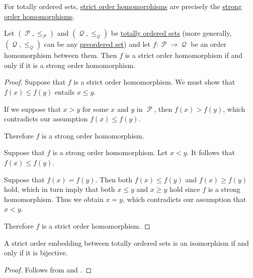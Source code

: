 \begin{proposition}\label{thm:totally_ordered_strong_homomorphism}
  For totally ordered sets, \hyperref[thm:partially_ordered_set/homomorphism]{strict order homomorphisms} are precisely the \hyperref[rem:first_order_strong_homomorphism]{strong order homomorphisms}.

  Let \( (\mscrP, \leq_\mscrP) \) and \( (\mscrQ, \leq_\mscrQ) \) be \hyperref[def:totally_ordered_set]{totally ordered sets} (more generally, \( (\mscrQ, \leq_\mscrQ) \) can be any \hyperref[def:preordered_set]{preordered set}) and let \( f: \mscrP \to \mscrQ \) be an order homomorphism between them. Then \( f \) is a strict order homomorphism if and only if it is a strong order homomorphism.
\end{proposition}
\begin{proof}
  \SufficiencySubProof Suppose that \( f \) is a strict order homomorphism. We must show that \( f(x) \leq f(y) \) entails \( x \leq y \).

  If we suppose that \( x > y \) for some \( x \) and \( y \) in \( \mscrP \), then \( f(x) > f(y) \), which contradicts our assumption \( f(x) \leq f(y) \).

  Therefore \( f \) is a strong order homomorphism.

  \NecessitySubProof Suppose that \( f \) is a strong order homomorphism. Let \( x < y \). It follows that \( f(x) \leq f(y) \).

  Suppose that \( f(x) = f(y) \). Then both \( f(x) \leq f(y) \) and \( f(x) \geq f(y) \) hold, which in turn imply that both \( x \leq y \) and \( x \geq y \) hold since \( f \) is a strong homomorphism. Thus we obtain \( x = y \), which contradicts our assumption that \( x < y \).

  Therefore \( f \) is a strict order homomorphism.
\end{proof}

\begin{corollary}\label{thm:totally_ordered_strict_isomorphisms}
  A strict order embedding between totally ordered sets is an isomorphism if and only if it is bijective.
\end{corollary}
\begin{proof}
  Follows from  and .
\end{proof}

